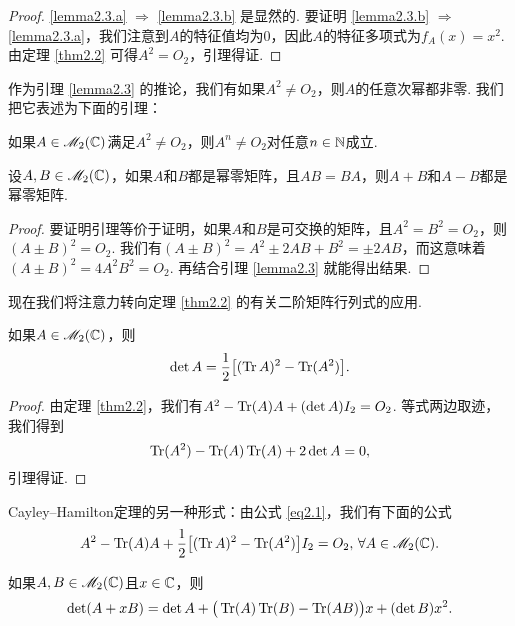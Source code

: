 \begin{proof}
  \ref{lemma2.3.a} $\Rightarrow$ \ref{lemma2.3.b} 是显然的. 要证明 \ref{lemma2.3.b} $\Rightarrow$ \ref{lemma2.3.a}，我们注意到$A$的特征值均为0，因此$A$的特征多项式为$f_A(x)=x^2$. 由定理 \ref{thm2.2} 可得$A^2=O_2$，引理得证.
\end{proof}

作为引理 \ref{lemma2.3} 的推论，我们有如果$A^2\ne O_2$，则$A$的任意次幂都非零. 我们把它表述为下面的引理：

\begin{lemma}
  如果$A\in\mathscr M_2(\mathbb C)$满足$A^2\ne O_2$，则$A^n\ne O_2$对任意$n\in\mathbb N$成立.
\end{lemma}

\begin{lemma}[幂零矩阵的一个事实.]

设$A,B\in\mathscr M_2(\mathbb C)$，如果$A$和$B$都是幂零矩阵，且$AB=BA$，则$A+B$和$A-B$都是幂零矩阵.
\end{lemma}

\begin{proof}
  要证明引理等价于证明，如果$A$和$B$是可交换的矩阵，且$A^2=B^2=O_2$，则$(A\pm B)^2=O_2$. 我们有$(A\pm B)^2=A^2\pm2AB+B^2=\pm2AB$，而这意味着$(A\pm B)^2=4A^2B^2=O_2$. 再结合引理 \ref{lemma2.3} 就能得出结果.
\end{proof}

现在我们将注意力转向定理 \ref{thm2.2} 的有关二阶矩阵行列式的应用.

\begin{lemma}[用迹来表示行列式.]

  如果$A\in\mathscr M_2(\mathbb C)$，则
  \begin{equation}\label{eq2.1}
    \det A = \frac12\big[ (\operatorname{Tr} A)^2 -\operatorname{Tr}(A^2) \big].
  \end{equation}
\end{lemma}

\begin{proof}
  由定理 \ref{thm2.2}，我们有$A^2-\operatorname{Tr}(A)A+(\det A)I_2=O_2$. 等式两边取迹，我们得到
  \[
    \operatorname{Tr}(A^2) - \operatorname{Tr}(A)\operatorname{Tr}(A) + 2\det A = 0,
  \]
  引理得证.
\end{proof}

\begin{remark}
  Cayley--Hamilton定理的另一种形式：由公式 \eqref{eq2.1}，我们有下面的公式
  \[
    A^2 - \operatorname{Tr}(A)A + \frac12\big[ (\operatorname{Tr} A)^2 -\operatorname{Tr}(A^2) \big]I_2 = O_2,\,\forall A\in\mathscr M_2(\mathbb C).
  \]
\end{remark}

\begin{mybox}
  \begin{lemma}

    如果$A,B\in\mathscr M_2(\mathbb C)$且$x\in\mathbb C$，则
    \begin{equation}\label{eq2.2}
      \det (A + xB) = \det A + \big(
        \operatorname{Tr}(A)\operatorname{Tr}(B) - \operatorname{Tr}(AB)
      \big)x + (\det B)x^2.
    \end{equation}
  \end{lemma}
\end{mybox}

